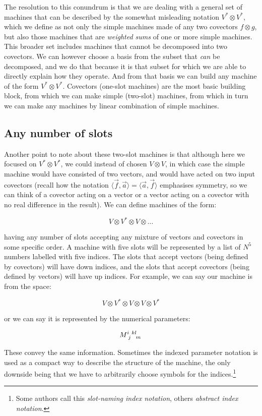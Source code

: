 The resolution to this conundrum is that we are dealing with a general set of machines that can be described by the somewhat misleading notation $V^* \otimes V^*$, which we define as not only the simple machines made of any two covectors $f \otimes g$, but also those machines that are \textit{weighted sums} of one or more simple machines. This broader set includes machines that cannot be decomposed into two covectors. We can however choose a basis from the subset that \textit{can} be decomposed, and we do that because it is that subset for which we are able to directly explain how they operate. And from that basis we can build any machine of the form $V^* \otimes V^*$. Covectors (one-slot machines) are the most basic building block, from which we can make simple (two-slot) machines, from which in turn we can make any machines by linear combination of simple machines.

\subsection{Any number of slots}

Another point to note about these two-slot machines is that although here we focused on $V^* \otimes V^*$, we could instead of chosen $V \otimes V$, in which case the simple machine would have consisted of two vectors, and would have acted on two input covectors (recall how the notation $\langle \vec{f}, \vec{a} \rangle = \langle \vec{a}, \vec{f} \rangle$ emphasises symmetry, so we can think of a covector acting on a vector or a vector acting on a covector with no real difference in the result). We can define machines of the form: 

$$
V \otimes V^* \otimes V \otimes \ldots
$$ 

having any number of slots accepting any mixture of vectors and covectors in some specific order. A machine with five slots will be represented by a list of $N^5$ numbers labelled with five indices. The slots that accept vectors (being defined by covectors) will have down indices, and the slots that accept covectors (being defined by vectors) will have up indices. For example, we can say our machine is from the space:

$$
V \otimes V^* \otimes V \otimes V \otimes V^*
$$ 

or we can say it is represented by the numerical parameters:

$$
M\indices{^i_j^k^l_m}
$$

These convey the same information. Sometimes the indexed parameter notation is used as a compact way to describe the structure of the machine, the only downside being that we have to arbitrarily choose symbols for the indices.\footnote{Some authors call this \textit{slot-naming index notation}, others \textit{abstract index notation}.}


